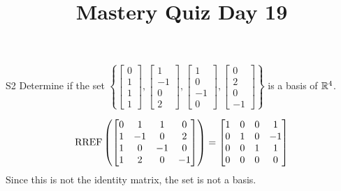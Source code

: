 \documentclass{sbgLAquiz}
\title{Mastery Quiz Day 19 }
\begin{document}
\begin{problem}{S2}
Determine if the set $\left\{ \begin{bmatrix} 0 \\ 1 \\ 1 \\ 1 \end{bmatrix}, \begin{bmatrix} 1 \\ -1 \\ 0 \\ 2 \end{bmatrix}, \begin{bmatrix} 1 \\ 0 \\ -1 \\ 0 \end{bmatrix}, \begin{bmatrix}0 \\ 2 \\ 0 \\ -1 \end{bmatrix} \right\}$ is a basis of $\mathbb{R}^4$.
\end{problem}
\begin{solution}
$$\operatorname{RREF}\left(\begin{bmatrix} 0 & 1 & 1 & 0 \\ 1 & -1 & 0 & 2   \\ 1 & 0 & -1 & 0  \\ 1 & 2 & 0 & -1  \end{bmatrix} \right) = \begin{bmatrix} 1 & 0 & 0 & 1  \\ 0 & 1 & 0 & -1  \\ 0 & 0 & 1 & 1  \\ 0 & 0 & 0 & 0 \end{bmatrix} $$
Since this is not the identity matrix, the set is not a basis.
\end{solution}
\end{document}
